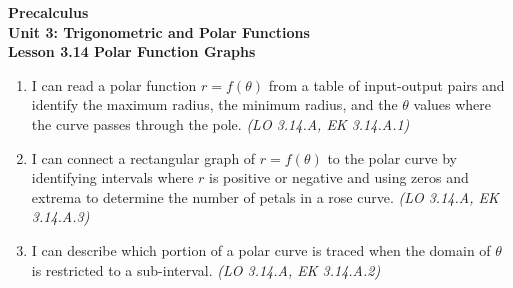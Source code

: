 \documentclass[10pt]{article}
\begin{document}
\vspace{-0.8in}

\begin{center}
  {\color{white}\textbf{\LARGE Precalculus}}\\[4pt]
  {\color{skymid}\large\textbf{Unit 3: Trigonometric and Polar Functions}}\\[6pt]
  {\color{white}\textbf{\large Lesson 3.14 \quad Polar Function Graphs}}
\end{center}

\vspace{0.22in}
\namedateperiod
\vspace{0.18in}

\begin{learningtargetbox}
\small
\begin{enumerate}[leftmargin=1.5em, itemsep=5pt]
  \item I can read a polar function $r = f(\theta)$ from a table of input-output pairs
    and identify the maximum radius, the minimum radius, and the $\theta$ values where
    the curve passes through the pole.
    \hfill\textit{(LO 3.14.A, EK 3.14.A.1)}
  \item I can connect a rectangular graph of $r = f(\theta)$ to the polar curve by
    identifying intervals where $r$ is positive or negative and using zeros and
    extrema to determine the number of petals in a rose curve.
    \hfill\textit{(LO 3.14.A, EK 3.14.A.3)}
  \item I can describe which portion of a polar curve is traced when the domain of
    $\theta$ is restricted to a sub-interval.
    \hfill\textit{(LO 3.14.A, EK 3.14.A.2)}
\end{enumerate}
\end{learningtargetbox}

\vspace{0.14in}
\end{document}

